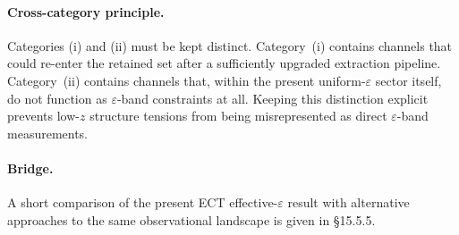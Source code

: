 \paragraph{Cross-category principle.}
Categories (i) and (ii) must be kept distinct. Category~(i) contains
channels that could re-enter the retained set after a sufficiently
upgraded extraction pipeline. Category~(ii) contains channels that,
within the present uniform-$\varepsilon$ sector itself, do not
function as $\varepsilon$-band constraints at all. Keeping this
distinction explicit prevents low-$z$ structure tensions from being
misrepresented as direct $\varepsilon$-band measurements.

\paragraph{Bridge.}
A short comparison of the present ECT effective-$\varepsilon$ result
with alternative approaches to the same observational landscape is
given in \S15.5.5.

